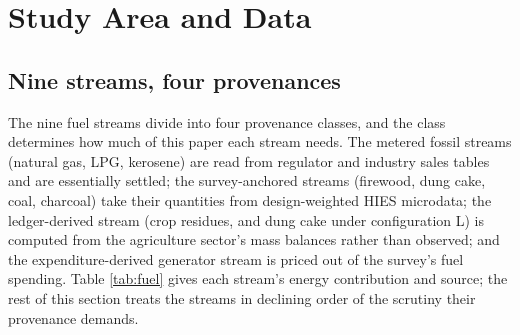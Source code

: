 \section{Study Area and Data}
\label{sec:data}

\subsection{Nine streams, four provenances}

The nine fuel streams divide into four provenance classes, and the class determines how
much of this paper each stream needs. The metered fossil streams (natural gas, LPG,
kerosene) are read from regulator and industry sales tables and are essentially settled;
the survey-anchored streams (firewood, dung cake, coal, charcoal) take their quantities from
design-weighted HIES microdata; the ledger-derived stream (crop residues, and dung cake
under configuration L) is computed from the agriculture sector's mass balances rather than observed; and the
expenditure-derived generator stream is priced out of the survey's fuel spending. Table
\ref{tab:fuel} gives each stream's energy contribution and source; the rest of this
section treats the streams in declining order of the scrutiny their provenance demands.

